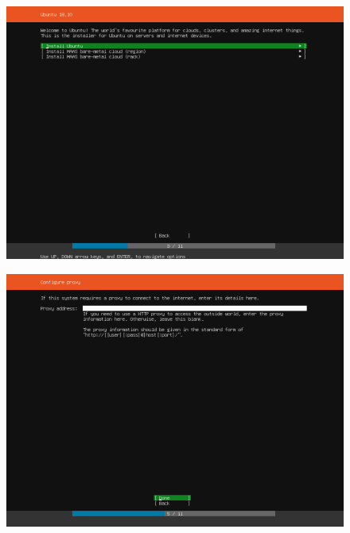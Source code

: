 \pagebreak
\begin{figure}[h!]
\centering
\captionsetup{skip=\skipfigurecaptionlen}
\includegraphics[width=1\textwidth]{screenshots/IY2D502-2019-02-21-19-16-06.png}
\caption{}
\label{fig:IY2D502-2019-02-21-19-16-06}
\end{figure}
\pagebreak
\begin{figure}[h!]
\centering
\captionsetup{skip=\skipfigurecaptionlen}
\includegraphics[width=1\textwidth]{screenshots/IY2D502-2019-02-21-19-16-24.png}
\caption{}
\label{fig:IY2D502-2019-02-21-19-16-24}
\end{figure}
\pagebreak
